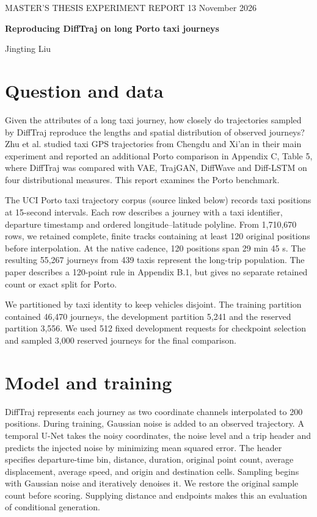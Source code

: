 \documentclass[11pt,a4paper]{article}
\begin{document}
{\small MASTER'S THESIS EXPERIMENT REPORT \hfill 13 November 2026}

{\LARGE\bfseries Reproducing DiffTraj on long Porto taxi journeys\par}
Jingting Liu

\section*{Question and data}
Given the attributes of a long taxi journey, how closely do trajectories sampled by DiffTraj reproduce the lengths and spatial distribution of observed journeys? Zhu et al. studied taxi GPS trajectories from Chengdu and Xi'an in their main experiment and reported an additional Porto comparison in Appendix C, Table 5, where DiffTraj was compared with VAE, TrajGAN, DiffWave and Diff-LSTM on four distributional measures. This report examines the Porto benchmark.

The UCI Porto taxi trajectory corpus (source linked below) records taxi positions at 15-second intervals. Each row describes a journey with a taxi identifier, departure timestamp and ordered longitude--latitude polyline. From 1,710,670 rows, we retained complete, finite tracks containing at least 120 original positions before interpolation. At the native cadence, 120 positions span 29 min 45 s. The resulting 55,267 journeys from 439 taxis represent the long-trip population. The paper describes a 120-point rule in Appendix B.1, but gives no separate retained count or exact split for Porto.

We partitioned by taxi identity to keep vehicles disjoint. The training partition contained 46,470 journeys, the development partition 5,241 and the reserved partition 3,556. We used 512 fixed development requests for checkpoint selection and sampled 3,000 reserved journeys for the final comparison.

\section*{Model and training}
DiffTraj represents each journey as two coordinate channels interpolated to 200 positions. During training, Gaussian noise is added to an observed trajectory. A temporal U-Net takes the noisy coordinates, the noise level and a trip header and predicts the injected noise by minimizing mean squared error. The header specifies departure-time bin, distance, duration, original point count, average displacement, average speed, and origin and destination cells. Sampling begins with Gaussian noise and iteratively denoises it. We restore the original sample count before scoring. Supplying distance and endpoints makes this an evaluation of conditional generation.
\end{document}
